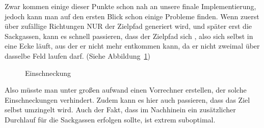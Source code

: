 Zwar kommen einige dieser Punkte schon nah an unsere finale Implementierung, jedoch kann man auf den ersten Blick schon einige Probleme finden. Wenn zuerst über zufällige Richtungen NUR der Zielpfad generiert wird, und später erst die Sackgassen, kann es schnell passieren, dass der Zielpfad sich , also sich selbst in eine Ecke läuft, aus der er nicht mehr entkommen kann, da er nicht zweimal über dasselbe Feld laufen darf. (Siehe Abbildung~\ref{fig:einschnecken})
    \begin{figure}[ht!]
    \centering

        \caption{Einschneckung}
        \label{fig:einschnecken}
    \end{figure}

Also müsste man unter großen aufwand einen Vorrechner erstellen, der solche Einschneckungen verhindert.
Zudem kann es hier auch passieren, dass das Ziel selbst umzingelt wird. Auch der Fakt, dass im Nachhinein ein zusätzlicher Durchlauf für die Sackgassen erfolgen sollte, ist extrem suboptimal.

